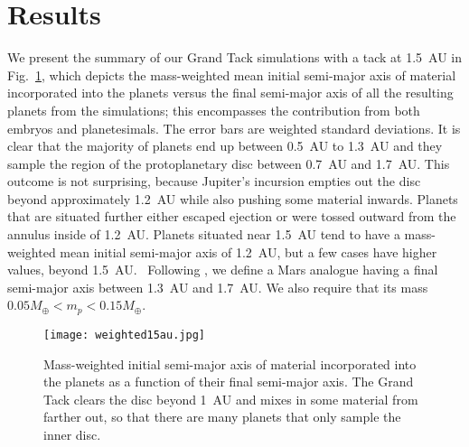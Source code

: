 \documentclass[preprint,5p,times,authoryear]{elsarticle}
\begin{document}
\section{Results}
We present the summary of our Grand Tack simulations with a tack at 1.5~AU in Fig.~\ref{fig:sumgt15}, which depicts the mass-weighted 
mean initial semi-major axis of material incorporated into the planets versus the final semi-major axis of all the resulting planets 
from the simulations; this encompasses the contribution from both embryos and planetesimals. The error bars are weighted 
standard deviations. It is clear that the majority of planets end up between 0.5~AU to 1.3~AU and they sample the region of the 
protoplanetary disc between 0.7~AU and 1.7~AU. This outcome is not surprising, because Jupiter's incursion empties out the disc beyond 
approximately 1.2~AU while also pushing some material inwards. Planets that are situated further either escaped ejection or were 
tossed outward from the annulus inside of 1.2~AU. Planets situated near 1.5~AU tend to have a mass-weighted mean initial semi-major 
axis of 1.2~AU, but a few cases have higher values, beyond 1.5~AU. {\ Following \citet{B16}, we define a Mars analogue having a 
final semi-major axis between 1.3~AU and 1.7~AU. We also require that its mass $0.05 M_\oplus < m_p < 0.15 M_\oplus$.} \\

\begin{figure}[ht!]
\texttt{[image: weighted15au.jpg]}
\caption{Mass-weighted initial semi-major axis of material incorporated into the planets as a function of their final semi-major axis. 
The Grand Tack clears the disc beyond 1~AU and mixes in some material from farther out, so that there are many planets that only 
sample the inner disc.}
\label{fig:sumgt15}
\end{figure}
\end{document}
